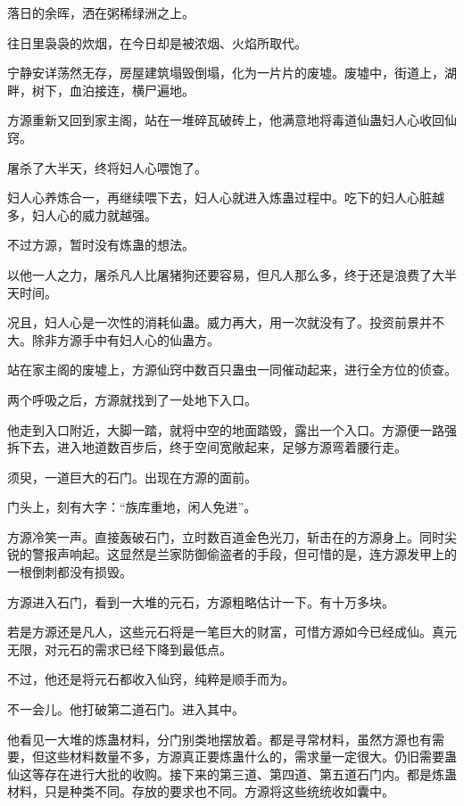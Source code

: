 
\begin{this_body}



落日的余晖，洒在粥稀绿洲之上。

往日里袅袅的炊烟，在今日却是被浓烟、火焰所取代。

宁静安详荡然无存，房屋建筑塌毁倒塌，化为一片片的废墟。废墟中，街道上，湖畔，树下，血泊接连，横尸遍地。

方源重新又回到家主阁，站在一堆碎瓦破砖上，他满意地将毒道仙蛊妇人心收回仙窍。

屠杀了大半天，终将妇人心喂饱了。

妇人心养炼合一，再继续喂下去，妇人心就进入炼蛊过程中。吃下的妇人心脏越多，妇人心的威力就越强。

不过方源，暂时没有炼蛊的想法。

以他一人之力，屠杀凡人比屠猪狗还要容易，但凡人那么多，终于还是浪费了大半天时间。

况且，妇人心是一次性的消耗仙蛊。威力再大，用一次就没有了。投资前景并不大。除非方源手中有妇人心的仙蛊方。

站在家主阁的废墟上，方源仙窍中数百只蛊虫一同催动起来，进行全方位的侦查。

两个呼吸之后，方源就找到了一处地下入口。

他走到入口附近，大脚一踏，就将中空的地面踏毁，露出一个入口。方源便一路强拆下去，进入地道数百步后，终于空间宽敞起来，足够方源弯着腰行走。

须臾，一道巨大的石门。出现在方源的面前。

门头上，刻有大字：“族库重地，闲人免进”。

方源冷笑一声。直接轰破石门，立时数百道金色光刀，斩击在的方源身上。同时尖锐的警报声响起。这显然是兰家防御偷盗者的手段，但可惜的是，连方源发甲上的一根倒刺都没有损毁。

方源进入石门，看到一大堆的元石，方源粗略估计一下。有十万多块。

若是方源还是凡人，这些元石将是一笔巨大的财富，可惜方源如今已经成仙。真元无限，对元石的需求已经下降到最低点。

不过，他还是将元石都收入仙窍，纯粹是顺手而为。

不一会儿。他打破第二道石门。进入其中。

他看见一大堆的炼蛊材料，分门别类地摆放着。都是寻常材料，虽然方源也有需要，但这些材料数量不多，方源真正要炼蛊什么的，需求量一定很大。仍旧需要蛊仙这等存在进行大批的收购。接下来的第三道、第四道、第五道石门内。都是炼蛊材料，只是种类不同。存放的要求也不同。方源将这些统统收如囊中。


\end{this_body}

